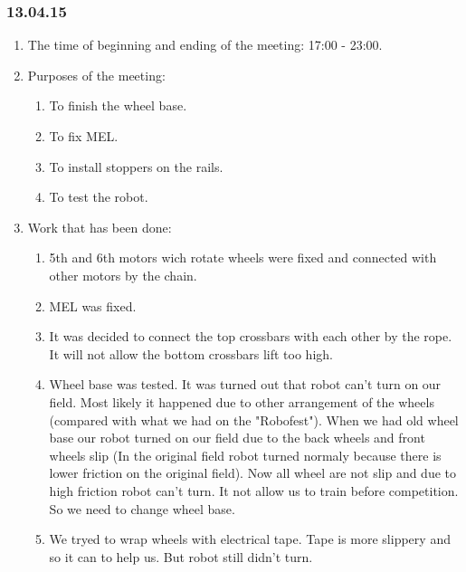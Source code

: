 \subsubsection{13.04.15}
\begin{enumerate}
	
	\item The time of beginning and ending of the meeting: 17:00 - 23:00.
	
	\item Purposes of the meeting: 
	\begin{enumerate}
		
		\item To finish the wheel base.
		
		\item To fix MEL.
		
		\item To install stoppers on the rails.
		
		\item To test the robot.
		
	\end{enumerate}
	
	\item Work that has been done:
	\begin{enumerate}
		
		\item 5th and 6th motors wich rotate wheels were fixed and connected with other motors by the chain.
		
		\item MEL was fixed.
		
		\item It was decided to connect the top crossbars with each other by the rope. It will not allow the bottom crossbars lift too high.
		
		\item Wheel base was tested. It was turned out that robot can't turn on our field. Most likely it happened due to other arrangement of the wheels (compared with what we had on the "Robofest"). When we had old wheel base our robot turned on our field due to the back wheels and front wheels slip (In the original field robot turned normaly because there is lower friction on the original field). Now all wheel are not slip and due to high friction robot can't turn. It not allow us to train before competition. So we need to change wheel base.
		
		\item We tryed to wrap wheels with electrical tape. Tape is more slippery and so it can to help us. But robot still didn't turn.
		

\end{enumerate}
\end{enumerate}
